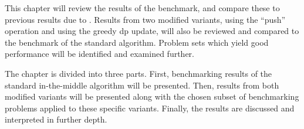 This chapter will review the results of the benchmark, and compare these to previous results due to \textcite{deGivry14}.
Results from two modified variants, using the \enquote{push} operation and using the greedy \gls{dp} update, will also be reviewed and compared to the benchmark of the standard algorithm.
Problem sets which yield good performance will be identified and examined further.

The chapter is divided into three parts.
First, benchmarking results of the standard in-the-middle algorithm will be presented.
Then, results from both modified variants will be presented along with the chosen subset of benchmarking problems applied to these specific variants.
Finally, the results are discussed and interpreted in further depth.
